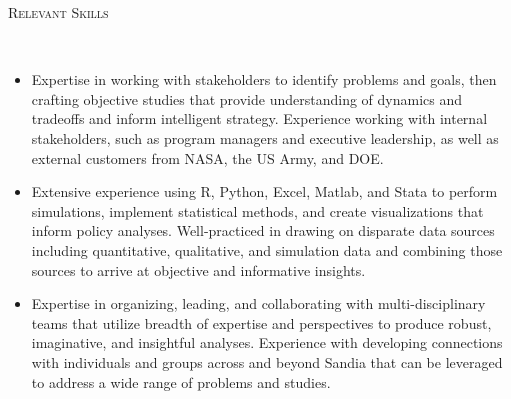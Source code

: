 \documentclass[11pt]{article}
\newenvironment{changemargin}[2]{%
  \begin{list}{}{%
    \setlength{\topsep}{0pt}%
    \setlength{\leftmargin}{#1}%
    \setlength{\rightmargin}{#2}%
    \setlength{\listparindent}{\parindent}%
    \setlength{\itemindent}{\parindent}%
    \setlength{\parsep}{\parskip}%
  }%
  \item[]}{\end{list}
}
\newcommand{\lineover}{
	\begin{changemargin}{-0.05in}{-0.05in}
		\vspace*{-8pt}
		\hrulefill \\
		\vspace*{-2pt}
	\end{changemargin}
}
\newcommand{\header}[1]{
	\begin{changemargin}{-0.5in}{-0.5in}
		\scshape{#1}\\
	\vspace*{-5pt}
  	\lineover
	\end{changemargin}
}
\newenvironment{body} {
	\vspace*{-16pt}
	\begin{changemargin}{-0.25in}{-0.5in}
  }	
	{\end{changemargin}
}
\begin{document}
\smallskip
\header{Relevant Skills}
\begin{body}
	\vspace{14pt}
	\begin{itemize}
		\item Expertise in working with stakeholders to identify problems and goals, then crafting objective studies that provide understanding of dynamics and tradeoffs and inform intelligent strategy. Experience working with internal stakeholders, such as program managers and executive leadership, as well as external customers from NASA, the US Army, and DOE.
		\item Extensive experience using R, Python, Excel, Matlab, and Stata to perform simulations, implement statistical methods, and create visualizations that inform policy analyses.  Well-practiced in drawing on disparate data sources including quantitative, qualitative, and simulation data and combining those sources to arrive at objective and informative insights.
		\item Expertise in organizing, leading, and collaborating with multi-disciplinary teams that utilize breadth of expertise and perspectives to produce robust, imaginative, and insightful analyses. Experience with developing connections with individuals and groups across and beyond Sandia that can be leveraged to address a wide range of problems and studies.
	\end{itemize}
\end{body}
\end{document}
